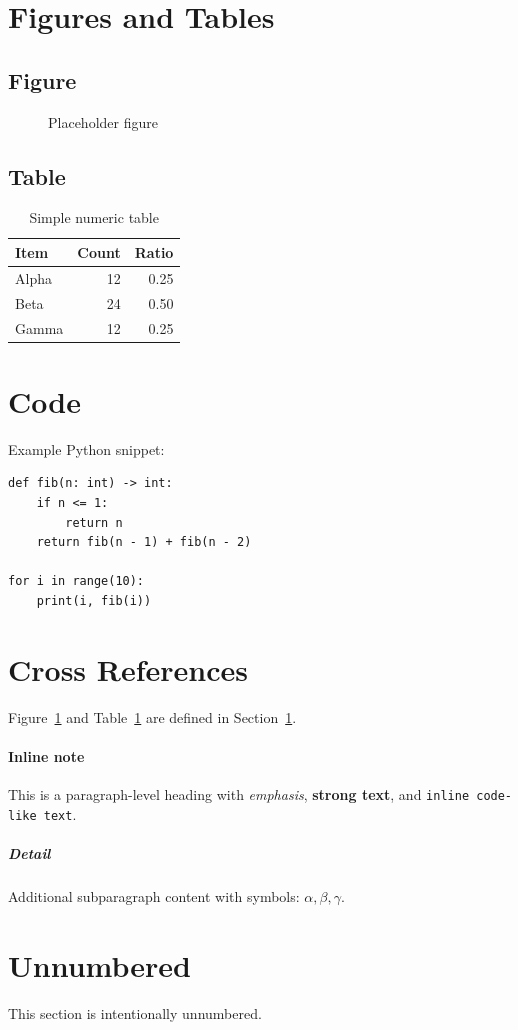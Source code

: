 \documentclass{article}
\begin{document}
\section{Figures and Tables}\label{sec:figures}
\subsection{Figure}
\begin{figure}[htbp]
  \centering
  \fbox{\rule{0pt}{4cm}\rule{6cm}{0pt}}
  \caption{Placeholder figure}
  \label{fig:placeholder}
\end{figure}

\subsection{Table}
\begin{table}[htbp]
  \centering
  \begin{tabular}{lrr}
    \hline
    Item & Count & Ratio \\
    \hline
    Alpha & 12 & 0.25 \\
    Beta & 24 & 0.50 \\
    Gamma & 12 & 0.25 \\
    \hline
  \end{tabular}
  \caption{Simple numeric table}
  \label{tab:simple}
\end{table}

\section{Code}
Example Python snippet:
\begin{lstlisting}
def fib(n: int) -> int:
    if n <= 1:
        return n
    return fib(n - 1) + fib(n - 2)

for i in range(10):
    print(i, fib(i))
\end{lstlisting}

\section{Cross References}
Figure~\ref{fig:placeholder} and Table~\ref{tab:simple}
are defined in Section~\ref{sec:figures}.

\paragraph{Inline note}
This is a paragraph-level heading with \emph{emphasis}, \textbf{strong text},
and \texttt{inline code-like text}.

\subparagraph{Detail}
Additional subparagraph content with symbols: $\alpha, \beta, \gamma$.

\section*{Unnumbered}
This section is intentionally unnumbered.
\end{document}
